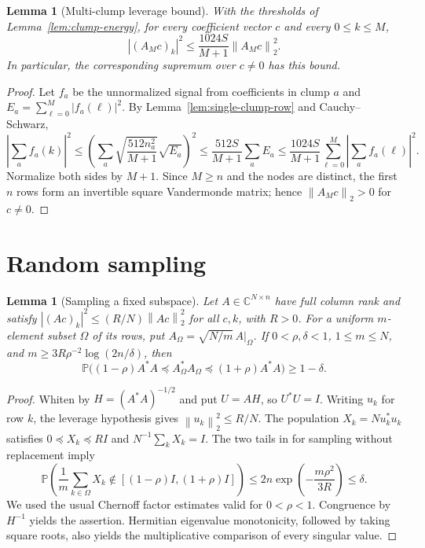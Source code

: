 \documentclass[11pt]{article}
\newtheorem{lemma}[theorem]{Lemma}
\theoremstyle{remark}\newtheorem{remark}[theorem]{Remark}
\newcommand{\C}{\mathbb C}
\newcommand{\norm}[1]{\left\lVert#1\right\rVert}
\newcommand{\abs}[1]{\left|#1\right|}
\begin{document}
\begin{lemma}[Multi-clump leverage bound]
\label{lem:multi-clump-leverage}
With the thresholds of Lemma~\ref{lem:clump-energy}, for every coefficient
vector $c$ and every $0\le k\le M$,
\begin{equation}
 \label{eq:multi-clump-leverage}
 \abs{(A_Mc)_k}^2\le\frac{1024S}{M+1}\norm{A_Mc}_2^2.
\end{equation}
In particular, the corresponding supremum over $c\ne0$ has this bound.
\end{lemma}
\begin{proof}
Let $f_a$ be the unnormalized signal from coefficients in clump $a$ and
$E_a=\sum_{\ell=0}^{M}\abs{f_a(\ell)}^2$. By
Lemma~\ref{lem:single-clump-row} and Cauchy--Schwarz,
\[
 \abs{\sum_af_a(k)}^2
 \le\left(\sum_a\sqrt{\frac{512n_a^2}{M+1}}\sqrt{E_a}\right)^2
 \le\frac{512S}{M+1}\sum_aE_a
 \le\frac{1024S}{M+1}\sum_{\ell=0}^{M}\abs{\sum_af_a(\ell)}^2.
\]
Normalize both sides by $M+1$. Since $M\ge n$ and the nodes are distinct,
the first $n$ rows form an invertible square Vandermonde matrix; hence
$\norm{A_Mc}_2>0$ for $c\ne0$.
\end{proof}

\section{Random sampling}
\begin{lemma}[Sampling a fixed subspace]
\label{lem:leverage-sampling}
Let $A\in\C^{N\times n}$ have full column rank and satisfy
$\abs{(Ac)_k}^2\le(R/N)\norm{Ac}_2^2$ for all $c,k$, with $R>0$.
For a uniform $m$-element subset $\Omega$ of its rows, put
$A_\Omega=\sqrt{N/m}\,A|_\Omega$. If $0<\rho,\delta<1$,
$1\le m\le N$, and $m\ge3R\rho^{-2}\log(2n/\delta)$, then
\[
 \mathbb P\bigl((1-\rho)A^*A\preceq A_\Omega^*A_\Omega
                       \preceq(1+\rho)A^*A\bigr)\ge1-\delta.
\]
\end{lemma}
\begin{proof}
Whiten by $H=(A^*A)^{-1/2}$ and put $U=AH$, so $U^*U=I$.
Writing $u_k$ for row $k$, the leverage hypothesis gives
$\norm{u_k}_2^2\le R/N$. The population
$X_k=N u_k^*u_k$ satisfies $0\preceq X_k\preceq RI$ and
$N^{-1}\sum_kX_k=I$. The two tails in
\cite[Theorem 2.2]{Tropp} for sampling without replacement imply
\[
 \mathbb P\left(\frac1m\sum_{k\in\Omega}X_k
                         \notin[(1-\rho)I,(1+\rho)I]\right)
 \le2n\exp\left(-\frac{m\rho^2}{3R}\right)\le\delta.
\]
We used the usual Chernoff factor estimates valid for $0<\rho<1$.
Congruence by $H^{-1}$ yields the assertion. Hermitian eigenvalue
monotonicity, followed by taking square roots, also yields the
multiplicative comparison of every singular value.
\end{proof}
\end{document}
